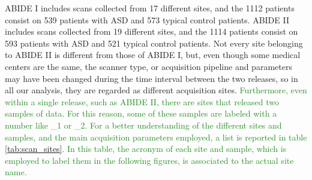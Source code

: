 \documentclass[11pt]{report}
\begin{document}
ABIDE I includes scans collected from 17 different sites, and the 1112 patients consist on 539 patients with ASD and 573 typical control patients.
ABIDE II includes scans collected from 19 different sites, and the 1114 patients consist on 593 patients with ASD and 521 typical control patients.
Not every site belonging to ABIDE II is different from those of ABIDE I, but, even though some medical centers are the same, the scanner type, or acquisition pipeline and parameters may have been changed during the time interval between the two releases, so in all our analysis, they are regarded as different acquisition sites.
\textcolor{ForestGreen}{
Furthermore, even within a single release, such as ABIDE II, there are sites that released two samples of data.
For this reason, some of these samples are labeled with a number like \_1 or \_2. 
For a better understanding of the different sites and samples, and the main acquisition parameters employed, a list is reported in table \ref{tab:scan_sites}.
In this table, the acronym of each site and sample, which is employed to label them in the following figures, is associated to the actual site name.
}
\end{document}
